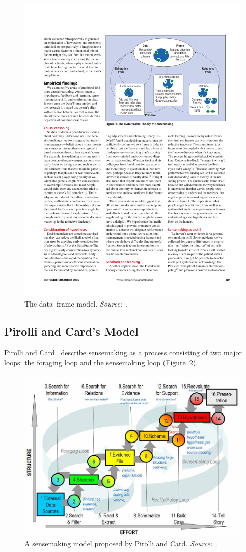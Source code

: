 \begin{figure}[!htb]
	\centering
	\includegraphics[width=.6\columnwidth]{data-frame-model}
	\caption{The data--frame model. \emph{Source:~\cite{Klein2003}}.}
	\label{fig:data-frame-model}
\end{figure}

\subsection{Pirolli and Card's Model}
Pirolli and Card~\cite{Pirolli2005} describe sensemaking as a process consisting of two major loops: the foraging loop and the sensemaking loop (Figure~\ref{fig:pirolli-card-model}). 

\begin{figure}[!htb]
	\centering
	\includegraphics[width=.6\columnwidth]{pirolli-card-model}
	\caption{A sensemaking model proposed by Pirolli and Card. \emph{Source:~\cite{Pirolli2005}}.}
	\label{fig:pirolli-card-model}
\end{figure}

